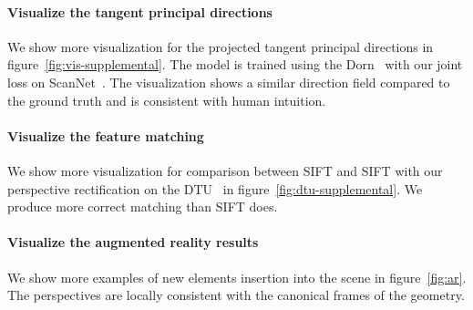 \paragraph{Visualize the tangent principal directions} We show more visualization for the projected tangent principal directions in figure~\ref{fig:vis-supplemental}. The model is trained using the Dorn~\cite{fu2018deep} with our joint loss on ScanNet~\cite{dai2017scannet}. The visualization shows a similar direction field compared to the ground truth and is consistent with human intuition.

\paragraph{Visualize the feature matching} We show more visualization for comparison between SIFT and SIFT with our perspective rectification on the DTU~\cite{aanaes2012interesting} in figure~\ref{fig:dtu-supplemental}. We produce more correct matching than SIFT does.

\paragraph{Visualize the augmented reality results} We show more examples of new elements insertion into the scene in figure~\ref{fig:ar}. The perspectives are locally consistent with the canonical frames of the geometry.
